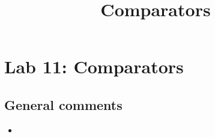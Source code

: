 \documentclass{article}
\title{Comparators}
\begin{document}
\maketitle

\section{Lab 11: Comparators}

\subsection*{General comments}

\begin{itemize}
\item
\end{itemize}
\end{document}
